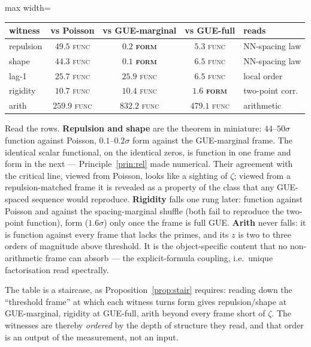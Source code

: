 \documentclass[11pt]{article}
\theoremstyle{definition}
\theoremstyle{plain}
\begin{document}
\begin{center}
\renewcommand{\arraystretch}{1.3}
\begin{adjustbox}{max width=\linewidth}\begin{tabular}{@{}lcccl@{}}
\toprule
witness & vs Poisson & vs GUE-marginal & vs GUE-full & reads \\
\midrule
repulsion & $49.5$ \textsc{func} & $\mathbf{0.2}$ \textsc{\textbf{form}} & $5.3$ \textsc{func} & NN-spacing law \\
shape     & $44.3$ \textsc{func} & $\mathbf{0.1}$ \textsc{\textbf{form}} & $6.5$ \textsc{func} & NN-spacing law \\
lag-1     & $25.7$ \textsc{func} & $25.9$ \textsc{func} & $6.5$ \textsc{func} & local order \\
rigidity  & $10.7$ \textsc{func} & $10.4$ \textsc{func} & $\mathbf{1.6}$ \textsc{\textbf{form}} & two-point corr. \\
arith     & $259.9$ \textsc{func} & $832.2$ \textsc{func} & $479.1$ \textsc{func} & arithmetic \\
\bottomrule
\end{tabular}\end{adjustbox}
\end{center}

\noindent Read the rows. \textbf{Repulsion and shape} are the theorem in miniature: $44$--$50\sigma$ function against Poisson, $0.1$--$0.2\sigma$ form against the GUE-marginal frame. The identical scalar functional, on the identical zeros, is function in one frame and form in the next --- Principle~\ref{prin:rel} made numerical. Their agreement with the critical line, viewed from Poisson, looks like a sighting of $\zeta$; viewed from a repulsion-matched frame it is revealed as a property of the class that any GUE-spaced sequence would reproduce. \textbf{Rigidity} falls one rung later: function against Poisson and against the spacing-marginal shuffle (both fail to reproduce the two-point function), form ($1.6\sigma$) only once the frame is full GUE. \textbf{Arith} never falls: it is function against every frame that lacks the primes, and its $z$ is two to three orders of magnitude above threshold. It is the object-specific content that no non-arithmetic frame can absorb --- the explicit-formula coupling, i.e.\ unique factorisation read spectrally.

The table is a staircase, as Proposition~\ref{prop:stair} requires: reading down the ``threshold frame'' at which each witness turns form gives repulsion/shape at GUE-marginal, rigidity at GUE-full, arith beyond every frame short of $\zeta$. The witnesses are thereby \emph{ordered} by the depth of structure they read, and that order is an output of the measurement, not an input.
\end{document}

